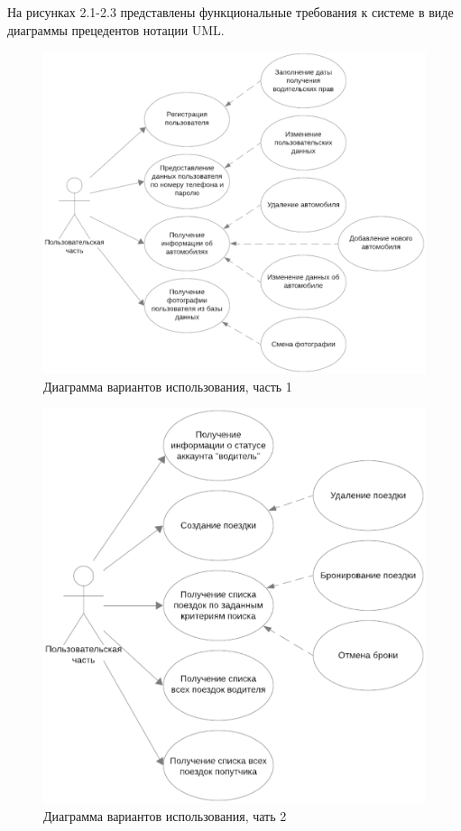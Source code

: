 На рисунках 2.1-2.3 представлены функциональные требования к системе в виде диаграммы прецедентов нотации UML.

\begin{figure}[H]
	\centering
	\includegraphics[width=0.7\linewidth]{images/Precedent1}
	\caption{Диаграмма вариантов использования, часть 1}
	\label{fig:precedent1}
\end{figure}

\begin{figure}[H]
	\centering
	\includegraphics[width=0.7\linewidth]{images/Precedent2}
	\caption{Диаграмма вариантов использования, чать 2}
	\label{fig:precedent2}
\end{figure}

